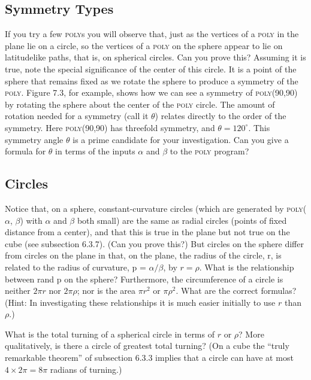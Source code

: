 \documentclass{book}
\begin{document}
\subsection{Symmetry Types}

If you try a few \textsc{poly}s you will observe that, just as the vertices of a
\textsc{poly} in the plane lie on a circle, so the vertices of a \textsc{poly} on the sphere
appear to lie on latitudelike paths, that is, on spherical circles. Can
you prove this? Assuming it is true, note the special significance of the
center of this circle. It is a point of the sphere that remains fixed as we
rotate the sphere to produce a symmetry of the \textsc{poly}. Figure 7.3, for
example, shows how we can see a symmetry of \textsc{poly}(90,90) by rotating
the sphere about the center of the \textsc{poly} circle. The amount of rotation
needed for a symmetry (call it $\theta$) relates directly to the order of the
symmetry. Here \textsc{poly}(90,90) has threefold symmetry, and $\theta = 120^{\circ}$.
This symmetry angle $\theta$ is a prime candidate for your investigation. Can
you give a formula for $\theta$ in terms of the inputs $\alpha$ and $\beta$ to the \textsc{poly}
program?

\subsection{Circles}

Notice that, on a sphere, constant-curvature circles (which are generated
by \textsc{poly}($\alpha$, $\beta$) with $\alpha$ and $\beta$ both small) are the same as radial circles
(points of fixed distance from a center), and that this is true in the plane
but not true on the cube (see subsection 6.3.7). (Can you prove this?)
But circles on the sphere differ from circles on the plane in that, on the
plane, the radius of the circle, r, is related to the radius of curvature,
p = $\alpha / \beta$, by $r = \rho$. What is the relationship between rand p on the
sphere? Furthermore, the circumference of a circle is neither $2 \pi r$ nor
$2 \pi \rho$; nor is the area $\pi r^2$ or $\pi \rho^2$. What are the correct formulas? (Hint:
In investigating these relationships it is much easier initially to use $r$
than $\rho$.)

What is the total turning of a spherical circle in terms of $r$ or $\rho$? More
qualitatively, is there a circle of greatest total turning? (On a cube the
``truly remarkable theorem'' of subsection 6.3.3 implies that a circle can
have at most $4 \times 2 \pi = 8 \pi$ radians of turning.)
\end{document}
